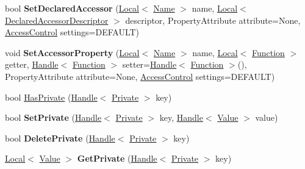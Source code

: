 \begin{DoxyCompactItemize}
\item 
\hypertarget{classv8_1_1Object_adee6f0d5287340378d0cd6aaf71434d3}{}bool {\bfseries Set\+Declared\+Accessor} (\hyperlink{classv8_1_1Local}{Local}$<$ \hyperlink{classv8_1_1Name}{Name} $>$ name, \hyperlink{classv8_1_1Local}{Local}$<$ \hyperlink{classv8_1_1DeclaredAccessorDescriptor}{Declared\+Accessor\+Descriptor} $>$ descriptor, Property\+Attribute attribute=None, \hyperlink{namespacev8_a31d8355cb043d7d2dda3f4a52760b64e}{Access\+Control} settings=D\+E\+F\+A\+U\+L\+T)\label{classv8_1_1Object_adee6f0d5287340378d0cd6aaf71434d3}

\item 
\hypertarget{classv8_1_1Object_a498f3ad26e24eae04eb76a270c1cc2b2}{}void {\bfseries Set\+Accessor\+Property} (\hyperlink{classv8_1_1Local}{Local}$<$ \hyperlink{classv8_1_1Name}{Name} $>$ name, \hyperlink{classv8_1_1Local}{Local}$<$ \hyperlink{classv8_1_1Function}{Function} $>$ getter, \hyperlink{classv8_1_1Handle}{Handle}$<$ \hyperlink{classv8_1_1Function}{Function} $>$ setter=\hyperlink{classv8_1_1Handle}{Handle}$<$ \hyperlink{classv8_1_1Function}{Function} $>$(), Property\+Attribute attribute=None, \hyperlink{namespacev8_a31d8355cb043d7d2dda3f4a52760b64e}{Access\+Control} settings=D\+E\+F\+A\+U\+L\+T)\label{classv8_1_1Object_a498f3ad26e24eae04eb76a270c1cc2b2}

\item 
bool \hyperlink{classv8_1_1Object_a5b6c320c5a31e2a3ddbd464835c8e9a7}{Has\+Private} (\hyperlink{classv8_1_1Handle}{Handle}$<$ \hyperlink{classv8_1_1Private}{Private} $>$ key)
\item 
\hypertarget{classv8_1_1Object_abb91701c8fbad34a4c0ccd3c7e18be28}{}bool {\bfseries Set\+Private} (\hyperlink{classv8_1_1Handle}{Handle}$<$ \hyperlink{classv8_1_1Private}{Private} $>$ key, \hyperlink{classv8_1_1Handle}{Handle}$<$ \hyperlink{classv8_1_1Value}{Value} $>$ value)\label{classv8_1_1Object_abb91701c8fbad34a4c0ccd3c7e18be28}

\item 
\hypertarget{classv8_1_1Object_a4751605ba0c560846832783efca46c71}{}bool {\bfseries Delete\+Private} (\hyperlink{classv8_1_1Handle}{Handle}$<$ \hyperlink{classv8_1_1Private}{Private} $>$ key)\label{classv8_1_1Object_a4751605ba0c560846832783efca46c71}

\item 
\hypertarget{classv8_1_1Object_a6d99ef0c7c505f1b7182f9fc11f373b0}{}\hyperlink{classv8_1_1Local}{Local}$<$ \hyperlink{classv8_1_1Value}{Value} $>$ {\bfseries Get\+Private} (\hyperlink{classv8_1_1Handle}{Handle}$<$ \hyperlink{classv8_1_1Private}{Private} $>$ key)\label{classv8_1_1Object_a6d99ef0c7c505f1b7182f9fc11f373b0}


\end{DoxyCompactItemize}
